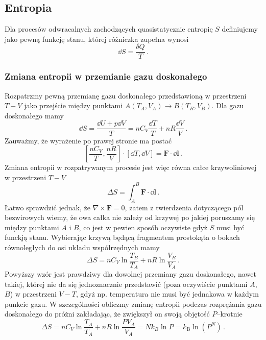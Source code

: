 \documentclass[../main.tex]{subfiles}
\begin{document}
\subsection{Entropia}
Dla procesów odwracalnych zachodzących quasistatycznie entropię \(S\) definiujemy jako pewną funkcję stanu, której różniczka zupełna wynosi
\begin{equation*}
    \dd{S}=\frac{\delta Q}{T}\,.
\end{equation*}
\subsubsection{Zmiana entropii w przemianie gazu doskonałego}
Rozpatrzmy pewną przemianę gazu doskonałego przedstawioną w przestrzeni \(T-V\) jako przejście między punktami \(A(T_A,V_A)\to B(T_B,V_B)\). Dla gazu doskonałego mamy
\begin{equation*}
    \dd{S}=\frac{\dd{U+p\dd{V}}}{T}=nC_V\frac{\dd{T}}{T}+nR\frac{\dd{V}}{V}\,.
\end{equation*}
Zauważmy, że wyrażenie po prawej stronie ma postać
\begin{equation*}
    \left[\frac{nC_V}{T},\frac{nR}{V}\right]\cdot\left[\dd{T},\dd{V}\right]=\mathbf{F}\cdot \dd{\mathbf{l}}\,.
\end{equation*}
Zmiana entropii w rozpatrywanym procesie jest więc równa całce krzywoliniowej w przestrzeni \(T-V\)
\begin{equation*}
    \Delta S=\int_A^B\mathbf{F}\cdot \dd{\mathbf{l}}\,.
\end{equation*}
Łatwo sprawdzić jednak, że \(\nabla\times\mathbf{F}=0\), zatem z twierdzenia dotyczącego pól bezwirowych wiemy, że owa całka nie zależy od krzywej po jakiej poruszamy się między punktami \(A\) i \(B\), co jest w pewien sposób oczywiste gdyż \(S\) musi być funckją stanu. Wybierając krzywą będącą fragmentem prostokąta o bokach równoległych do osi układu współrzędnych mamy
\begin{equation*}
    \Delta S=nC_V\ln\frac{T_B}{T_A}+nR\ln\frac{V_B}{V_A}\,.
\end{equation*}
Powyższy wzór jest prawdziwy dla dowolnej przemiany gazu doskonałego, nawet takiej, której nie da się jednoznacznie przedstawić (poza oczywiście punktami \(A\), \(B\)) w przestrzeni \(V-T\), gdyż np. temperatura nie musi być jednakowa w każdym punkcie gazu. W szczególności obliczmy zmianę entropii podczas rozprężania gazu doskonałego do próżni zakładając, że zwiększył on swoją objętość \(P\)--krotnie
\begin{equation*}
    \Delta S=nC_V\ln\frac{T_A}{T_A}+nR\ln\frac{PV_A}{V_A}=Nk_B\ln P=k_\text{B}\ln({P^N})\,.
\end{equation*}
\end{document}
